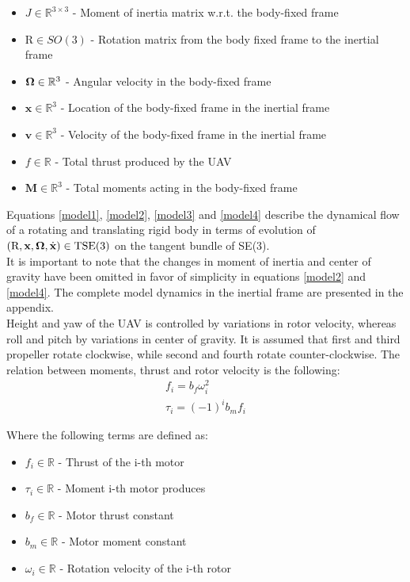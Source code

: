\begin{itemize}
	\item $J \in \mathbb{R}^{3 \times 3}$ - Moment of inertia matrix w.r.t. the body-fixed frame
	
	\item $\text{R} \in SO(3)$ - Rotation matrix from the body fixed frame to the inertial frame
	
	\item $\boldsymbol{\Omega} \in \mathbb{R}^3$ - Angular velocity in the body-fixed frame
	
	\item $\textbf{x} \in \mathbb{R}^3$ - Location of the body-fixed frame in the inertial frame
	
	\item $\textbf{v} \in \mathbb{R}^3$ - Velocity of the body-fixed frame in the inertial frame
	
	\item $f \in \mathbb{R}$ - Total thrust produced by the UAV
	
	\item $\textbf{M} \in \mathbb{R}^3$ - Total moments acting in the body-fixed frame
\end{itemize}
\indent Equations \ref{model1}, \ref{model2}, \ref{model3} and \ref{model4} describe the dynamical flow of a rotating and translating rigid body in terms of evolution of $(\text{R},\textbf{x},\boldsymbol{\Omega},\dot{\textbf{x}})\in \text{TSE}(3)$ on the tangent bundle of SE(3). \\
It is important to note that the changes in moment of inertia and center of gravity have been omitted in favor of simplicity in equations \ref{model2} and \ref{model4}. The complete model dynamics in the inertial frame are presented in the appendix.\\

\indent Height and yaw of the UAV is controlled by variations in rotor velocity, whereas roll and pitch by variations in center of gravity. It is assumed that first and third propeller rotate clockwise, while second and fourth rotate counter-clockwise. The relation between moments, thrust and rotor velocity is the following:
\begin{gather}
	f_i = b_f \omega_{i}^2 \label{force}\\
	\tau_i = (-1)^i b_m f_i
\end{gather}

\noindent Where the following terms are defined as:

\begin{itemize}
	\item $f_i \in \mathbb{R}$ - Thrust of the i-th motor
	
	\item $\tau_i \in \mathbb{R}$ - Moment i-th motor produces
	
	\item $b_f \in \mathbb{R}$ - Motor thrust constant
	
	\item $b_m \in \mathbb{R}$ - Motor moment constant
	
	\item $\omega_i \in \mathbb{R}$ - Rotation velocity of the i-th rotor
\end{itemize}

